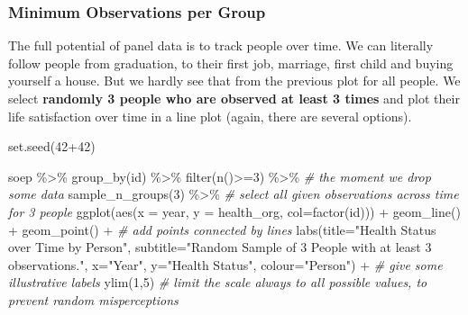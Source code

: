 \documentclass[
]{book}
\newenvironment{Shaded}{\begin{snugshade}}{\end{snugshade}}
\newcommand{\AttributeTok}[1]{\textcolor[rgb]{0.77,0.63,0.00}{#1}}
\newcommand{\CommentTok}[1]{\textcolor[rgb]{0.56,0.35,0.01}{\textit{#1}}}
\newcommand{\DecValTok}[1]{\textcolor[rgb]{0.00,0.00,0.81}{#1}}
\newcommand{\FunctionTok}[1]{\textcolor[rgb]{0.00,0.00,0.00}{#1}}
\newcommand{\NormalTok}[1]{#1}
\newcommand{\SpecialCharTok}[1]{\textcolor[rgb]{0.00,0.00,0.00}{#1}}
\newcommand{\StringTok}[1]{\textcolor[rgb]{0.31,0.60,0.02}{#1}}
\begin{document}
\hypertarget{minimum-observations-per-group}{%
\subsubsection{Minimum Observations per Group}\label{minimum-observations-per-group}}

The full potential of panel data is to track people over time. We can literally follow people from graduation, to their first job, marriage, first child and buying yourself a house. But we hardly see that from the previous plot for all people. We select \textbf{randomly 3 people who are observed at least 3 times} and plot their life satisfaction over time in a line plot (again, there are several options).

\begin{Shaded}
\begin{Highlighting}[]
\FunctionTok{set.seed}\NormalTok{(}\DecValTok{42}\SpecialCharTok{+}\DecValTok{42}\NormalTok{)}

\NormalTok{soep }\SpecialCharTok{\%\textgreater{}\%}
  \FunctionTok{group\_by}\NormalTok{(id) }\SpecialCharTok{\%\textgreater{}\%}
  \FunctionTok{filter}\NormalTok{(}\FunctionTok{n}\NormalTok{()}\SpecialCharTok{\textgreater{}=}\DecValTok{3}\NormalTok{) }\SpecialCharTok{\%\textgreater{}\%}  \CommentTok{\# the moment we drop some data}
  \FunctionTok{sample\_n\_groups}\NormalTok{(}\DecValTok{3}\NormalTok{) }\SpecialCharTok{\%\textgreater{}\%} \CommentTok{\# select all given observations across time for 3 people}
  \FunctionTok{ggplot}\NormalTok{(}\FunctionTok{aes}\NormalTok{(}\AttributeTok{x =}\NormalTok{ year, }\AttributeTok{y =}\NormalTok{ health\_org, }\AttributeTok{col=}\FunctionTok{factor}\NormalTok{(id))) }\SpecialCharTok{+}
  \FunctionTok{geom\_line}\NormalTok{() }\SpecialCharTok{+} \FunctionTok{geom\_point}\NormalTok{() }\SpecialCharTok{+} \CommentTok{\# add points connected by lines}
  \FunctionTok{labs}\NormalTok{(}\AttributeTok{title=}\StringTok{"Health Status over Time by Person"}\NormalTok{,}
       \AttributeTok{subtitle=}\StringTok{"Random Sample of 3 People with at least 3 observations."}\NormalTok{,}
       \AttributeTok{x=}\StringTok{"Year"}\NormalTok{, }\AttributeTok{y=}\StringTok{"Health Status"}\NormalTok{, }\AttributeTok{colour=}\StringTok{"Person"}\NormalTok{) }\SpecialCharTok{+} \CommentTok{\# give some illustrative labels}
  \FunctionTok{ylim}\NormalTok{(}\DecValTok{1}\NormalTok{,}\DecValTok{5}\NormalTok{) }\CommentTok{\# limit the scale always to all possible values, to prevent random misperceptions}
\end{Highlighting}
\end{Shaded}
\end{document}
